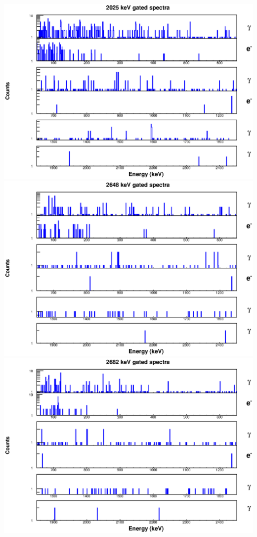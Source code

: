 \begin{landscape}
\includegraphics[scale=1.1]{154Gd_Appendix/2025_combined.eps}
\includegraphics[scale=1.1]{154Gd_Appendix/2648_combined.eps}
\includegraphics[scale=1.1]{154Gd_Appendix/2682_combined.eps}
\end{landscape}